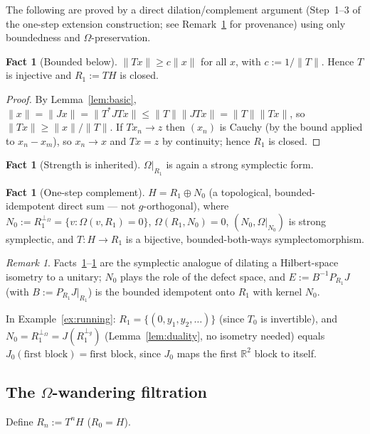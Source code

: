 \documentclass[11pt,a4paper]{article}
\theoremstyle{definition}
\newtheorem{fact}[theorem]{Fact}
\theoremstyle{remark}
\newtheorem{remark}[theorem]{Remark}
\newcommand{\R}{\mathbb{R}}
\newcommand{\cJ}{J}
\newcommand{\Om}{\Omega}
\newcommand{\pO}{\perp_\Omega}
\newcommand{\pg}{\perp_g}
\begin{document}
The following are proved by a direct dilation/complement argument (Step~1--3 of the
one-step extension construction; see Remark~\ref{rem:cite} for provenance) using only
boundedness and $\Om$-preservation.

\begin{fact}[Bounded below]
\label{fact:1}
$\|Tx\|\ge c\|x\|$ for all $x$, with $c:=1/\|T\|$. Hence $T$ is injective and $R_1:=TH$ is
closed.
\end{fact}
\begin{proof}
By Lemma~\ref{lem:basic}, $\|x\|=\|\cJ x\|=\|T^*\cJ Tx\|\le\|T\|\|\cJ Tx\|=\|T\|\|Tx\|$, so
$\|Tx\|\ge\|x\|/\|T\|$. If $Tx_n\to z$ then $(x_n)$ is Cauchy (by the bound applied to
$x_n-x_m$), so $x_n\to x$ and $Tx=z$ by continuity; hence $R_1$ is closed.
\end{proof}

\begin{fact}[Strength is inherited]
\label{fact:2}
$\Om|_{R_1}$ is again a strong symplectic form.
\end{fact}

\begin{fact}[One-step complement]
\label{fact:3}
$H=R_1\oplus N_0$ (a topological, bounded-idempotent direct sum --- not $g$-orthogonal),
where $N_0:=R_1^{\pO}=\{v:\Om(v,R_1)=0\}$, $\Om(R_1,N_0)=0$, $(N_0,\Om|_{N_0})$ is strong
symplectic, and $T:H\to R_1$ is a bijective, bounded-both-ways symplectomorphism.
\end{fact}

\begin{remark}
\label{rem:cite}
Facts~\ref{fact:1}--\ref{fact:3} are the symplectic analogue of dilating a Hilbert-space
isometry to a unitary; $N_0$ plays the role of the defect space, and $E:=B^{-1}P_{R_1}\cJ$
(with $B:=P_{R_1}\cJ|_{R_1}$) is the bounded idempotent onto $R_1$ with kernel $N_0$.
\end{remark}

In Example~\ref{ex:running}: $R_1=\{(0,y_1,y_2,\dots)\}$ (since $T_0$ is invertible), and
$N_0=R_1^{\pO}=\cJ(R_1^{\pg})$ (Lemma~\ref{lem:duality}, no isometry needed) equals
$J_0(\text{first block})=\text{first block}$, since $J_0$ maps the first $\R^2$ block to
itself.

\subsection{The $\Om$-wandering filtration}

Define $R_n:=T^nH$ ($R_0=H$).
\end{document}
